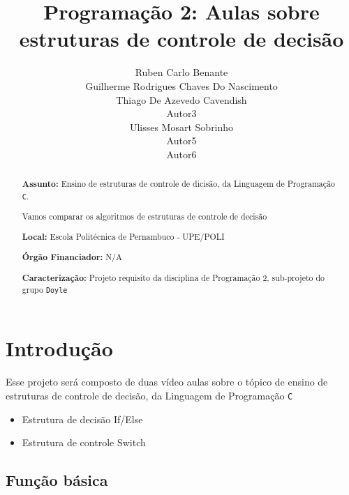 \documentclass[a4paper,10pt]{article}  %
\title{ Programação 2: 
        Aulas sobre estruturas de controle de decisão}
\author{Ruben Carlo Benante \\ Guilherme Rodrigues Chaves Do Nascimento \\ Thiago De Azevedo Cavendish \\ Autor3 \\ Ulisses Mosart Sobrinho \\ Autor5 \\ Autor6 }
\begin{document}

\maketitle


\begin{abstract}

\textbf{Assunto:} Ensino de estruturas de controle de dicisão, da Linguagem de Programação \texttt{C}.

 Vamos comparar os algoritmos de estruturas de controle de decisão %

\textbf{Local:} Escola Politécnica de Pernambuco - UPE/POLI

\textbf{Órgão Financiador:} N/A

\textbf{Caracterização:} Projeto requisito da disciplina de Programação 2, sub-projeto do grupo \texttt{Doyle}


\end{abstract}




\section{Introdução}


   Esse projeto será composto de duas vídeo aulas sobre o tópico de ensino de estruturas de controle de decisão,  da Linguagem de Programação \texttt{C}

\begin{itemize}

 \item Estrutura de decisão If/Else
 \item Estrutura de controle Switch
\end{itemize}


 \subsection{Função básica}
\end{document}
